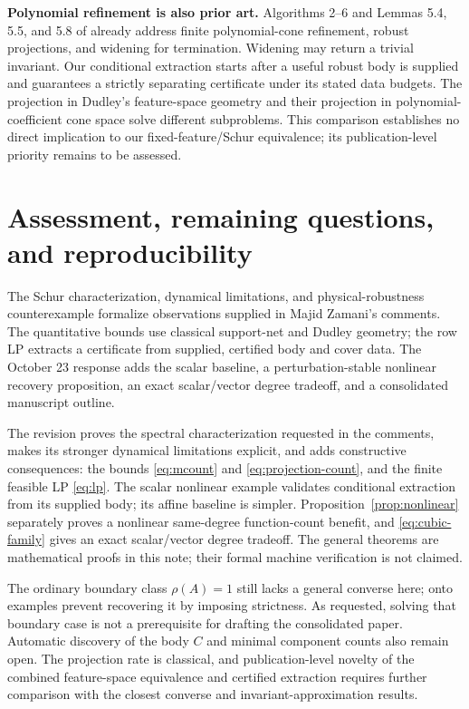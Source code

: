 \documentclass[10pt,letterpaper]{article}
\theoremstyle{remark}
\begin{document}
\textbf{Polynomial refinement is also prior art.}
Algorithms 2--6 and Lemmas 5.4, 5.5, and 5.8 of \cite{cone2024} already address
finite polynomial-cone refinement, robust projections, and widening for
termination. Widening may return a trivial invariant.
Our conditional extraction starts after a useful robust body is supplied and
guarantees a strictly separating certificate under its stated data budgets.
The projection in Dudley's feature-space geometry and their projection in
polynomial-coefficient cone space solve different subproblems.
This comparison establishes no direct implication to our fixed-feature/Schur
equivalence; its publication-level priority remains to be assessed.

\section{Assessment, remaining questions, and reproducibility}
The Schur characterization, dynamical limitations, and physical-robustness counterexample formalize observations supplied in Majid Zamani's comments. The quantitative bounds use classical support-net and Dudley geometry; the row LP extracts a certificate from supplied, certified body and cover data. The October 23 response adds the scalar baseline, a perturbation-stable nonlinear recovery proposition, an exact scalar/vector degree tradeoff, and a consolidated manuscript outline.

The revision proves the spectral characterization requested in the comments, makes its stronger dynamical limitations explicit, and adds constructive consequences: the bounds \eqref{eq:mcount} and \eqref{eq:projection-count}, and the finite feasible LP \eqref{eq:lp}. The scalar nonlinear example validates conditional extraction from its supplied body; its affine baseline is simpler. Proposition~\ref{prop:nonlinear} separately proves a nonlinear same-degree function-count benefit, and \eqref{eq:cubic-family} gives an exact scalar/vector degree tradeoff. The general theorems are mathematical proofs in this note; their formal machine verification is not claimed.

The ordinary boundary class $\rho(A)=1$ still lacks a general converse here; onto examples prevent recovering it by imposing strictness. As requested, solving that boundary case is not a prerequisite for drafting the consolidated paper. Automatic discovery of the body $C$ and minimal component counts also remain open. The projection rate is classical, and publication-level novelty of the combined feature-space equivalence and certified extraction requires further comparison with the closest converse and invariant-approximation results.
\end{document}
